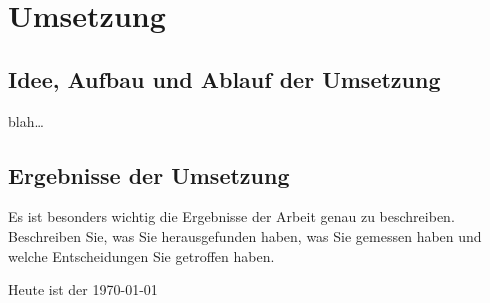 \chapter{Umsetzung}

\section{Idee, Aufbau und Ablauf der Umsetzung}
blah\dots

\section{Ergebnisse der Umsetzung}

Es ist besonders wichtig die Ergebnisse der Arbeit genau zu beschreiben.
Beschreiben Sie, was Sie herausgefunden haben, was Sie gemessen haben und welche 
Entscheidungen Sie getroffen haben.



Heute ist der \today 


